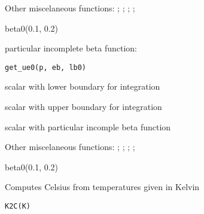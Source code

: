 \documentclass[a4paper]{book}
\begin{document}
%
\begin{SeeAlso}\relax
Other miscelaneous functions: ;
; ;
; 
\end{SeeAlso}
%
\begin{Examples}
\begin{ExampleCode}
beta0(0.1, 0.2)
\end{ExampleCode}
\end{Examples}
%
\begin{Description}\relax
particular incomplete beta function:
\end{Description}
%
\begin{Usage}
\begin{verbatim}
get_ue0(p, eb, lb0)
\end{verbatim}
\end{Usage}
%
\begin{Arguments}
\begin{ldescription}
\item[\code{x0}] scalar with lower boundary for integration

\item[\code{x1}] scalar with upper boundary for integration
\end{ldescription}
\end{Arguments}
%
\begin{Value}
scalar with particular incomple beta function
\end{Value}
%
\begin{SeeAlso}\relax
Other miscelaneous functions: ;
; ;
; 
\end{SeeAlso}
%
\begin{Examples}
\begin{ExampleCode}
beta0(0.1, 0.2)
\end{ExampleCode}
\end{Examples}
%
\begin{Description}\relax
Computes Celsius from temperatures given in Kelvin
\end{Description}
%
\begin{Usage}
\begin{verbatim}
K2C(K)
\end{verbatim}
\end{Usage}
\end{document}
